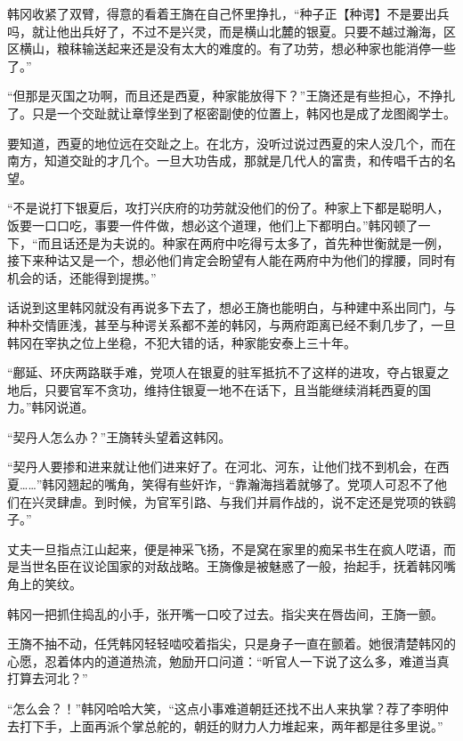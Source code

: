 韩冈收紧了双臂，得意的看着王旖在自己怀里挣扎，“种子正【种谔】不是要出兵吗，就让他出兵好了，不过不是兴灵，而是横山北麓的银夏。只要不越过瀚海，区区横山，粮秣输送起来还是没有太大的难度的。有了功劳，想必种家也能消停一些了。”

“但那是灭国之功啊，而且还是西夏，种家能放得下？”王旖还是有些担心，不挣扎了。只是一个交趾就让章惇坐到了枢密副使的位置上，韩冈也是成了龙图阁学士。

要知道，西夏的地位远在交趾之上。在北方，没听过说过西夏的宋人没几个，而在南方，知道交趾的才几个。一旦大功告成，那就是几代人的富贵，和传唱千古的名望。

“不是说打下银夏后，攻打兴庆府的功劳就没他们的份了。种家上下都是聪明人，饭要一口口吃，事要一件件做，想必这个道理，他们上下都明白。”韩冈顿了一下，“而且话还是为夫说的。种家在两府中吃得亏太多了，首先种世衡就是一例，接下来种诂又是一个，想必他们肯定会盼望有人能在两府中为他们的撑腰，同时有机会的话，还能得到提携。”

话说到这里韩冈就没有再说多下去了，想必王旖也能明白，与种建中系出同门，与种朴交情匪浅，甚至与种谔关系都不差的韩冈，与两府距离已经不剩几步了，一旦韩冈在宰执之位上坐稳，不犯大错的话，种家能安泰上三十年。

“鄜延、环庆两路联手难，党项人在银夏的驻军抵抗不了这样的进攻，夺占银夏之地后，只要官军不贪功，维持住银夏一地不在话下，且当能继续消耗西夏的国力。”韩冈说道。

“契丹人怎么办？”王旖转头望着这韩冈。

“契丹人要掺和进来就让他们进来好了。在河北、河东，让他们找不到机会，在西夏……”韩冈翘起的嘴角，笑得有些奸诈，“靠瀚海挡着就够了。党项人可忍不了他们在兴灵肆虐。到时候，为官军引路、与我们并肩作战的，说不定还是党项的铁鹞子。”

丈夫一旦指点江山起来，便是神采飞扬，不是窝在家里的痴呆书生在疯人呓语，而是当世名臣在议论国家的对敌战略。王旖像是被魅惑了一般，抬起手，抚着韩冈嘴角上的笑纹。

韩冈一把抓住捣乱的小手，张开嘴一口咬了过去。指尖夹在唇齿间，王旖一颤。

王旖不抽不动，任凭韩冈轻轻啮咬着指尖，只是身子一直在颤着。她很清楚韩冈的心愿，忍着体内的道道热流，勉励开口问道：“听官人一下说了这么多，难道当真打算去河北？”

“怎么会？！”韩冈哈哈大笑，“这点小事难道朝廷还找不出人来执掌？荐了李明仲去打下手，上面再派个掌总舵的，朝廷的财力人力堆起来，两年都是往多里说。”

